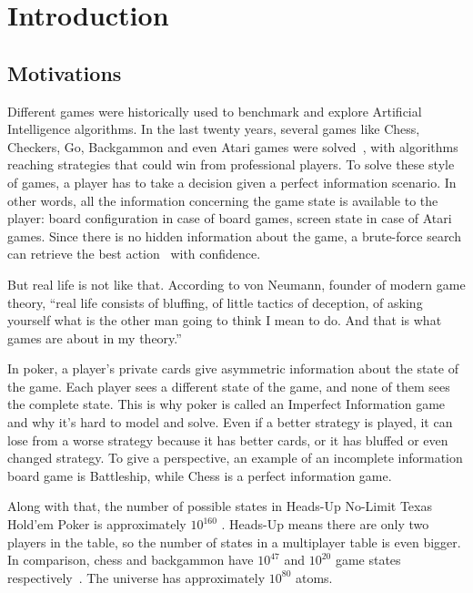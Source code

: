 \newpage

\chapter{Introduction}
\label{chap:introduction}

\section{Motivations}
\label{sec:motivations}
Different games were historically used to benchmark and explore Artificial Intelligence algorithms. In the last twenty years, several games like Chess, Checkers, Go, Backgammon and even Atari games were solved~\cite{Kocsis2006}, with algorithms reaching strategies that could win from professional players. To solve these style of games, a player has to take a decision given a perfect information scenario. In other words, all the information concerning the game state is available to the player: board configuration in case of board games, screen state in case of Atari games. Since there is no hidden information about the game, a brute-force search can retrieve the best action~\cite{Billings1998} with confidence.

But real life is not like that. According to von Neumann, founder of modern game theory, “real life consists of bluffing, of little tactics of deception, of asking yourself what is the other man going to think I mean to do. And that is what games are about in my theory.”~\cite{Bronowski1973}

In poker, a player’s private cards give asymmetric information about the state of the game. Each player sees a different state of the game, and none of them sees the complete state. This is why poker is called an Imperfect Information game and why it's hard to model and solve. Even if a better strategy is played, it can lose from a worse strategy because it has better cards, or it has bluffed or even changed strategy. To give a perspective, an example of an incomplete information board game is Battleship, while Chess is a perfect information game.

Along with that, the number of possible states in Heads-Up No-Limit Texas Hold’em Poker is approximately $10^{160}$ . Heads-Up means there are only two players in the table, so the number of states in a multiplayer table is even bigger. In comparison, chess and backgammon have $10^{47}$ and $10^{20}$ game states respectively~\cite{Johanson2013}. The universe has approximately $10^{80}$ atoms.

